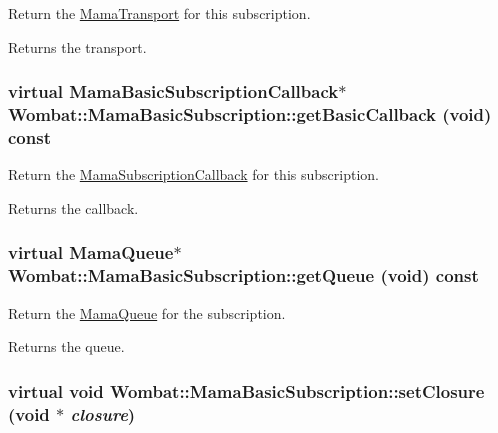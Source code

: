 Return the {\ttfamily \hyperlink{classWombat_1_1MamaTransport}{MamaTransport}} for this subscription. \begin{DoxyReturn}{Returns}
the transport. 
\end{DoxyReturn}
\hypertarget{classWombat_1_1MamaBasicSubscription_a1b58d2258ea0d4c09f53737abac4e6ce}{
\subsubsection[{getBasicCallback}]{\setlength{\rightskip}{0pt plus 5cm}virtual {\bf MamaBasicSubscriptionCallback}$\ast$ Wombat::MamaBasicSubscription::getBasicCallback (void) const}}
\label{classWombat_1_1MamaBasicSubscription_a1b58d2258ea0d4c09f53737abac4e6ce}


Return the {\ttfamily \hyperlink{classWombat_1_1MamaSubscriptionCallback}{MamaSubscriptionCallback}} for this subscription. \begin{DoxyReturn}{Returns}
the callback. 
\end{DoxyReturn}
\hypertarget{classWombat_1_1MamaBasicSubscription_ad942460e43402f4e97f8d18086eb61c7}{
\subsubsection[{getQueue}]{\setlength{\rightskip}{0pt plus 5cm}virtual {\bf MamaQueue}$\ast$ Wombat::MamaBasicSubscription::getQueue (void) const}}
\label{classWombat_1_1MamaBasicSubscription_ad942460e43402f4e97f8d18086eb61c7}


Return the {\ttfamily \hyperlink{classWombat_1_1MamaQueue}{MamaQueue}} for the subscription. \begin{DoxyReturn}{Returns}
the queue. 
\end{DoxyReturn}
\hypertarget{classWombat_1_1MamaBasicSubscription_afd46faca33c0b3198e75d906dc79f848}{
\subsubsection[{setClosure}]{\setlength{\rightskip}{0pt plus 5cm}virtual void Wombat::MamaBasicSubscription::setClosure (void $\ast$ {\em closure})}}
\label{classWombat_1_1MamaBasicSubscription_afd46faca33c0b3198e75d906dc79f848}


